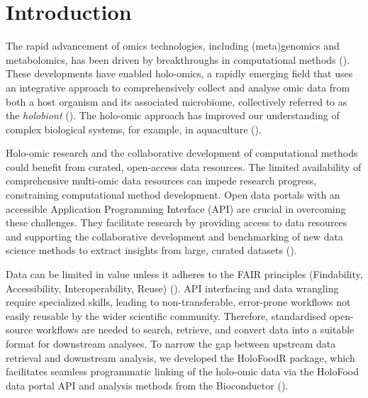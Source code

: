 \documentclass[unnumsec,webpdf,namedate,modern,large]{oup-authoring-template}%
\begin{document}

\maketitle

\section{Introduction}

The rapid advancement of omics technologies, including (meta)genomics and metabolomics, has been driven by breakthroughs in computational methods (\cite{moreno-indias_statistical_2021,marcos-zambrano_toolbox_2023,santamaria_bioinformatic_2024}).
These developments have enabled holo-omics, a rapidly emerging field that uses an integrative approach to comprehensively collect and analyse omic data from both a host organism and its associated microbiome, collectively referred to as the {\it holobiont} (\cite{nyholmHoloOmicsIntegratedHostMicrobiota2020,limborgAppliedHologenomicsFeasibility2018,odriozola_practical_2024}). The holo-omic approach has improved our understanding of complex biological systems, for example, in aquaculture (\cite{limborgAppliedHologenomicsFeasibility2018,atlantic_salmon}).

Holo-omic research and the collaborative development of computational methods could benefit from curated, open-access data resources.
The limited availability of comprehensive multi-omic data resources can impede research progress, constraining computational method development. Open data portals with an accessible Application Programming Interface (API) are crucial in overcoming these challenges. They facilitate research by providing access to data resources and supporting the collaborative development and benchmarking of new data science methods to extract insights from large, curated datasets (\cite{pasolli_2017}).

Data can be limited in value unless it adheres to the FAIR principles (Findability, Accessibility, Interoperability, Reuse) (\cite{wilkinsonFAIRGuidingPrinciples2016}). API interfacing and data wrangling require specialized skills, leading to non-transferable, error-prone workflows not easily reusable by the wider scientific community. Therefore, standardised open-source workflows are needed to search, retrieve, and convert data into a suitable format for downstream analyses.
To narrow the gap between upstream data retrieval and downstream analysis, we developed the HoloFoodR package, which facilitates seamless programmatic linking of the holo-omic data via the HoloFood data portal API and analysis methods from the Bioconductor  (\cite{gentleman_bioconductor_2004,callahan_bioconductor_2016}).
\end{document}
